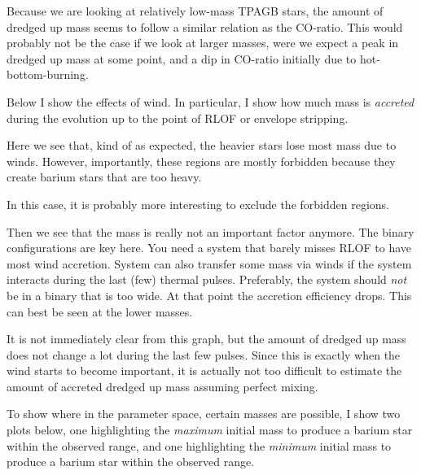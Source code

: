 \documentclass[a4paper,10pt]{article}
\begin{document}
\nextpage

Because we are looking at relatively low-mass TPAGB stars, the amount of dredged up mass seems to follow a similar relation as the CO-ratio. This would probably not be the case if we look at larger masses, were we expect a peak in dredged up mass at some point, and a dip in CO-ratio initially due to hot-bottom-burning.

Below I show the effects of wind. In particular, I show how much mass is \emph{accreted} during the evolution up to the point of RLOF or envelope stripping.
\begin{figure}[ht]
    \centering
\end{figure}

Here we see that, kind of as expected, the heavier stars lose most mass due to winds. However, importantly, these regions are mostly forbidden because they create barium stars that are too heavy.

In this case, it is probably more interesting to exclude the forbidden regions.

\begin{figure}[ht]
    \centering
\end{figure}

Then we see that the mass is really not an important factor anymore. The binary configurations are key here. You need a system that barely misses RLOF to have most wind accretion. System can also transfer some mass via winds if the system interacts during the last (few) thermal pulses. Preferably, the system should \emph{not} be in a binary that is too wide. At that point the accretion efficiency drops. This can best be seen at the lower masses.

It is not immediately clear from this graph, but the amount of dredged up mass does not change a lot during the last few pulses. Since this is exactly when the wind starts to become important, it is actually not too difficult to estimate the amount of accreted dredged up mass assuming perfect mixing.

To show where in the parameter space, certain masses are possible, I show two plots below, one highlighting the \emph{maximum} initial mass to produce a barium star within the observed range, and one highlighting the \emph{minimum} initial mass to produce a barium star within the observed range.
\begin{figure}[ht]
    \centering
\end{figure}
\end{document}
